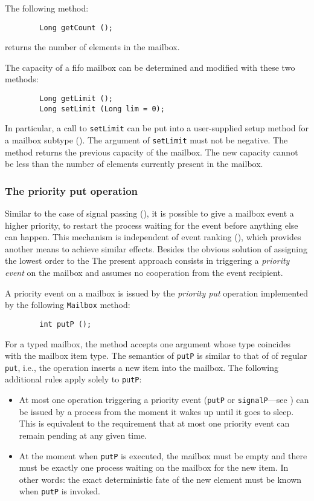 \medskip

\noindent
The following method:
\begin{verbatim}
        Long getCount ();
\end{verbatim}
returns the number of elements in the mailbox.

The capacity of a fifo
mailbox can be determined and modified with these two methods:
\begin{verbatim}
        Long getLimit ();
        Long setLimit (Long lim = 0);
\end{verbatim}
In particular, a call to {\tt setLimit} can be put into a user-supplied
setup method for a mailbox subtype ().
The argument of {\tt setLimit} must not be negative.
The method returns the previous capacity of the mailbox.
The new capacity cannot be less than the number of elements currently
present in the mailbox.

\subsubsection{The priority put operation}
\label{rm_mb_fi_pp}

Similar to the case of signal passing (), it is
possible to give a mailbox event
a higher priority, to restart the process waiting for the event
before anything else can happen.
This mechanism is independent of event ranking (), which
provides another means to achieve similar effects.
Besides the obvious solution of assigning the lowest order to the
The present approach consists in triggering a
{\em priority event\/} on the mailbox and
assumes no cooperation from the event recipient.

A priority event on a mailbox is issued by the {\em priority put\/}
operation implemented by the following {\tt Mailbox} method:
\begin{verbatim}
        int putP ();
\end{verbatim}
For a typed mailbox, the method accepts one argument whose type coincides with
the mailbox item type.
The semantics of {\tt putP} is
similar to that of of regular {\tt put}, i.e.,
the operation inserts a new item into the mailbox.
The following additional rules apply solely to {\tt putP}:
\begin{itemize}
\item
At most one operation triggering a priority event ({\tt putP} or
{\tt signalP}---see )
can be issued by a process from the moment
it wakes up until it goes to sleep.
This is equivalent to the requirement that
at most one priority event can remain pending at any given time.
\item
At the moment when {\tt putP} is executed, the mailbox must be empty and
there must be exactly one process waiting on the mailbox for the new item.
In other words: the exact deterministic
fate of the new element must be known when {\tt putP} is invoked.
\end{itemize}

